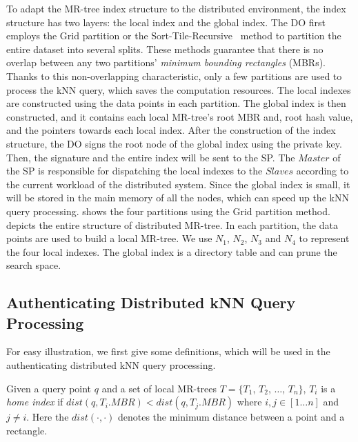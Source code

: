 To adapt the MR-tree index structure to the distributed environment, the index structure has two layers: the local index and the global index. The DO first employs the Grid partition or the Sort-Tile-Recursive~\cite{10.1109/ICDE.1997.582015} method to partition the entire dataset into several splits. These methods guarantee that there is no overlap between any two partitions' \emph{minimum bounding rectangles} (MBRs). Thanks to this non-overlapping characteristic, only a few partitions are used to process the kNN query, which saves the computation resources. The local indexes are constructed using the data points in each partition. The global index is then constructed, and it contains each local MR-tree's root MBR and, root hash value, and the pointers towards each local index. After the construction of the index structure, the DO signs the root node of the global index using the private key. Then, the signature and the entire index will be sent to the SP\@. The $Master$ of the SP is responsible for dispatching the local indexes to the $Slaves$ according to the current workload of the distributed system. Since the global index is small, it will be stored in the main memory of all the nodes, which can speed up the kNN query processing.  shows the four partitions using the Grid partition method.  depicts the entire structure of distributed MR-tree. In each partition, the data points are used to build a local MR-tree. We use $N_{1}$, $N_{2}$, $N_{3}$ and $N_{4}$ to represent the four local indexes. The global index is a directory table and can prune the search space.

\subsection{Authenticating Distributed kNN Query Processing}

For easy illustration, we first give some definitions, which will be used in the authenticating distributed kNN query processing.

\begin{definition}\label{def:knn:def1}
  Given a query point $q$ and a set of local MR-trees $T = \{T_{1}$, $T_{2}$, $\dots$, $T_{n}\}$, $T_{i}$ is a \emph{home index} if $dist(q,T_{i}.MBR) < dist(q,T_{j}.MBR)$ where $i, j\in [1 \dots n]$ and $j \neq i$. Here the $dist(\cdot,\cdot)$ denotes the minimum distance between a point and a rectangle.
\end{definition}

